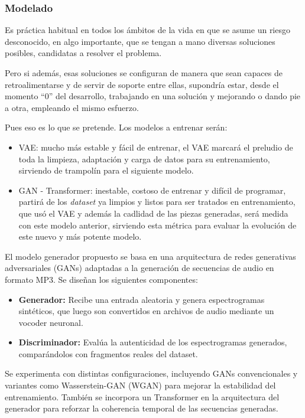 \subsubsection{Modelado}

Es práctica habitual en todos los ámbitos de la vida en que se asume un riesgo desconocido, en algo importante, que se tengan a mano diversas soluciones posibles, candidatas a resolver el problema.

Pero si además, esas soluciones se configuran de manera que sean capaces de retroalimentarse y de servir de soporte entre ellas, supondría estar, desde el momento ``0'' del desarrollo, trabajando en una solución y mejorando o dando pie a otra, empleando el mismo esfuerzo.

Pues eso es lo que se pretende. Los modelos a entrenar serán:
\begin{itemize}
    \item VAE: mucho más estable y fácil de entrenar, el VAE marcará el preludio de toda la limpieza, adaptación y carga de datos para su entrenamiento, sirviendo de trampolín para el siguiente modelo.
    \item GAN - Transformer: inestable, costoso de entrenar y difícil de programar, partirá de los \emph{dataset} ya limpios y listos para ser tratados en entrenamiento, que usó el VAE y además la cadlidad de las piezas generadas, será medida con este modelo anterior, sirviendo esta métrica para evaluar la evolución de este nuevo y más potente modelo.
\end{itemize}

El modelo generador propuesto se basa en una arquitectura de redes generativas adversariales (GANs) adaptadas a la generación de secuencias de audio en formato MP3. Se diseñan los siguientes componentes:
\begin{itemize}
    \item \textbf{Generador:} Recibe una entrada aleatoria y genera espectrogramas sintéticos, que luego son convertidos en archivos de audio mediante un vocoder neuronal.
    \item \textbf{Discriminador:} Evalúa la autenticidad de los espectrogramas generados, comparándolos con fragmentos reales del dataset.
\end{itemize}

Se experimenta con distintas configuraciones, incluyendo GANs convencionales y variantes como Wasserstein-GAN (WGAN) para mejorar la estabilidad del entrenamiento. También se incorpora un Transformer en la arquitectura del generador para reforzar la coherencia temporal de las secuencias generadas.

